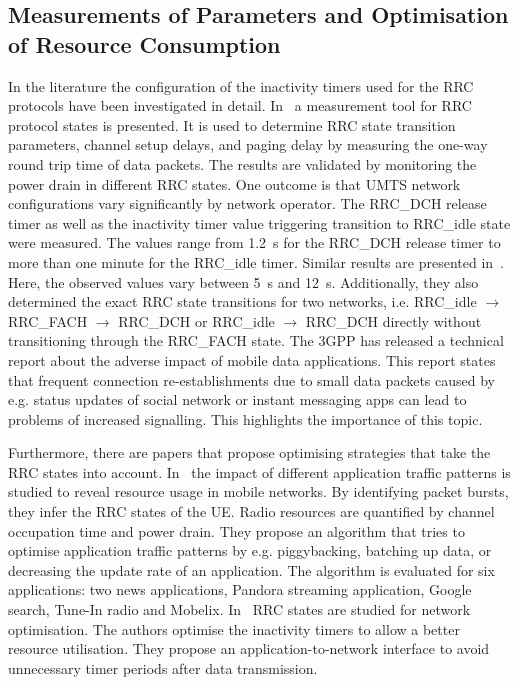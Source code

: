 \subsection{Measurements of  Parameters and Optimisation of Resource Consumption}\label{sec:network:background:measurement_optimisation}

In the literature the configuration of the inactivity timers used for the \gls{RRC} protocols have been investigated in detail.
In~\cite{Perala2009} a measurement tool for \gls{RRC} protocol states is presented. 
It is used to determine \gls{RRC} state transition parameters, channel setup delays, and paging delay by measuring the one-way round trip time of data packets.
The results are validated by monitoring the power drain in different \gls{RRC} states.
One outcome is that \gls{UMTS} network configurations vary significantly by network operator.
The \gls{RRC_DCH} release timer as well as the inactivity timer value triggering transition to \gls{RRC_idle} state were measured.
The values range from \SI{1.2}{\second} for the \gls{RRC_DCH} release timer to more than one minute for the \gls{RRC_idle} timer.
Similar results are presented in~\cite{Qian2010a}.
Here, the observed values vary between \SI{5}{\second} and \SI{12}{\second}. 
Additionally, they also determined the exact \gls{RRC} state transitions for two networks, i.e. \gls{RRC_idle} \(\rightarrow\) \gls{RRC_FACH} \(\rightarrow\) \gls{RRC_DCH} or \gls{RRC_idle} \(\rightarrow\) \gls{RRC_DCH} directly without transitioning through the \gls{RRC_FACH} state.
The \gls{3GPP} has released a technical report \cite{3GPP_22801} about the adverse impact of mobile data applications.
This report states that frequent connection re-establishments due to small data packets caused by e.g. status updates of social network or instant messaging apps can lead to problems of increased signalling.
This highlights the importance of this topic.

Furthermore, there are papers that propose optimising strategies that take the \gls{RRC} states into account. 
In~\cite{Qian2011a} the impact of different application traffic patterns is studied to reveal resource usage in mobile networks.
By identifying packet bursts, they infer the \gls{RRC} states of the \gls{UE}.
Radio resources are quantified by channel occupation time and power drain.
They propose an algorithm that tries to optimise application traffic patterns by e.g. piggybacking, batching up data, or decreasing the update rate of an application.
The algorithm is evaluated for six applications: two news applications, Pandora streaming application, Google search, Tune-In radio and Mobelix. 
In~\cite{Qian2010b} \gls{RRC} states are studied for network optimisation.
The authors optimise the inactivity timers to allow a better resource utilisation. 
They propose an application-to-network interface to avoid unnecessary timer periods after data transmission.

